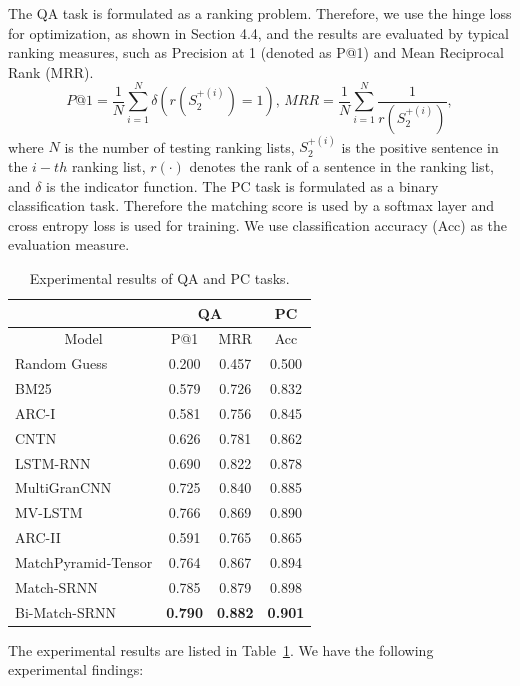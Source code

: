 The QA task is formulated as a ranking problem. Therefore, we use the hinge loss for optimization, as shown in Section 4.4, and the results are evaluated by typical ranking measures, such as Precision at 1 (denoted as P@1) and Mean Reciprocal Rank (MRR).
\begin{equation*}
P@1=\frac{1}{N}\sum_{i=1}^{N}\delta(r(S_2^{+(i)})= 1),\,
MRR=\frac{1}{N}\sum_{i=1}^{N}\frac{1}{r({S_{2}^{+(i)}})},
\end{equation*}
where $N$ is the number of testing ranking lists, $S_2^{+(i)}$ is the positive sentence in the $i-th$ ranking list, $r(\cdot)$ denotes the rank of a sentence in the ranking list, and $\delta$ is the indicator function.
The PC task is formulated as a binary classification task. Therefore the matching score is used by a softmax layer and cross entropy loss is used for training.
We use classification accuracy (Acc) as the evaluation measure.

\begin{table}[t]
\begin{tabular}{l|cc|c} \hline
&
\multicolumn{2}{c|}{QA} &
\multicolumn{1}{c}{PC} \\ \hline
\multicolumn{1}{c|}{Model} &
\multicolumn{1}{c}{P@1} &
\multicolumn{1}{c|}{MRR} &
\multicolumn{1}{c}{Acc} \\ \hline
Random Guess			& 0.200 & 0.457 & 0.500   \\
BM25        			& 0.579 & 0.726 & 0.832	    \\ \hline
ARC-I 					& 0.581 & 0.756 	& 0.845	\\
CNTN					& 0.626 & 0.781 	& 0.862 	\\
LSTM-RNN   		  		& 0.690 	& 0.822 	& 0.878 	\\ \hline
MultiGranCNN			& 0.725 	& 0.840 & 0.885		\\
MV-LSTM  				& 0.766	& 0.869	& 0.890	\\ \hline
ARC-II 					& 0.591 & 0.765 	& 0.865	\\
MatchPyramid-Tensor			& 0.764 & 0.867 	& 0.894\\ \hline
Match-SRNN 				& 0.785 & 0.879 & 0.898 \\
Bi-Match-SRNN  			& \textbf{0.790}	& \textbf{0.882} 	& \textbf{0.901}	\\
\hline
\end{tabular}
\centering
\caption{Experimental results of QA and PC tasks.}\label{tab:results}
\end{table}
The experimental results are listed in Table~\ref{tab:results}. We have the following experimental findings:

